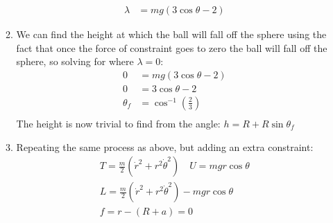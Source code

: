 \documentclass[12pt]{article}
\begin{document}
\begin{enumerate}
\begin{enumerate}
\begin{align*}
        \lambda &=mg(3\cos\theta-2)
      \end{align*}
      \item We can find the height at which the ball will fall off the sphere using the fact that once the force of constraint goes to zero the ball will fall off the sphere, so solving for where $\lambda=0$:
      \begin{align*}
        0&=mg(3\cos\theta-2)\\
        0&=3\cos\theta-2\\
        \theta_f&=\cos^{-1}\left(\frac{2}{3}\right)\\
      \end{align*}
      The height is now trivial to find from the angle: $h=R+R\sin\theta_f$
      \item Repeating the same process as above, but adding an extra constraint:
      \begin{gather*}
        T=\frac{m}{2}\left(\dot{r}^2+r^2\dot{\theta}^2\right)\quad U=mgr\cos\theta\\
        L=\frac{m}{2}\left(\dot{r}^2+r^2\dot{\theta}^2\right)-mgr\cos\theta\\
        f=r-(R+a)=0
      \end{gather*}
    \end{enumerate}
  \end{enumerate}
\end{document}
